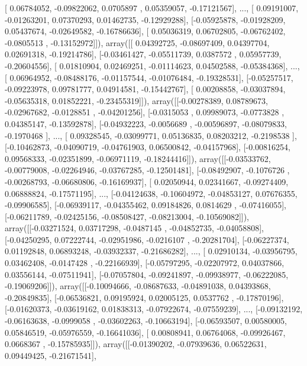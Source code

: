 \documentclass{article}
\begin{document}
       [ 0.06784052, -0.09822062,  0.0705897 ,  0.05359057, -0.17121567],
       ..., 
       [ 0.09191007, -0.01263201,  0.07370293,  0.01462735, -0.12929288],
       [-0.05925878, -0.01928209,  0.05437674, -0.02649582, -0.16786636],
       [ 0.05036319,  0.06702805, -0.06762402, -0.0805513 , -0.13152972]]), array([[ 0.04392725, -0.08697409,  0.04397704,  0.02691318, -0.19214786],
       [-0.03461427, -0.05511739,  0.0387572 ,  0.05957739, -0.20604556],
       [ 0.01810904,  0.02469251, -0.01114623,  0.04502588, -0.05384368],
       ..., 
       [ 0.06964952, -0.08488176, -0.01157544, -0.01076484, -0.19328531],
       [-0.05257517, -0.09223978,  0.09781777,  0.04914581, -0.15442767],
       [ 0.00208858, -0.03037894, -0.05635318,  0.01852221, -0.23455319]]), array([[-0.00278389,  0.08789673, -0.02967682, -0.0128851 , -0.04201256],
       [-0.0315053 ,  0.09989073, -0.0773828 ,  0.04385147, -0.13592878],
       [-0.04932223, -0.0056689 , -0.00596897, -0.08079833, -0.1970468 ],
       ..., 
       [ 0.09328545, -0.03099771,  0.05136835,  0.08203212, -0.2198538 ],
       [-0.10462873, -0.04090719, -0.04761903,  0.06500842, -0.04157968],
       [-0.00816254,  0.09568333, -0.02351899, -0.06971119, -0.18244416]]), array([[-0.03533762, -0.00779008, -0.02264946, -0.03767285, -0.12501481],
       [-0.08492907, -0.1076726 , -0.00268793, -0.06680806, -0.16169937],
       [ 0.02050944,  0.02341667, -0.09274409,  0.06888824, -0.17571195],
       ..., 
       [-0.04124638, -0.10604972, -0.04853127,  0.07676355, -0.09906585],
       [-0.06939117, -0.04355462,  0.09184826,  0.0814629 , -0.07416055],
       [-0.06211789, -0.02425156, -0.08508427, -0.08213004, -0.10569082]]), array([[-0.03271524,  0.03717298, -0.0487145 , -0.04852735, -0.04058808],
       [-0.04250295,  0.07222744, -0.02951986, -0.0216107 , -0.20281704],
       [-0.06227374,  0.01192848,  0.06893248, -0.03932337, -0.21686282],
       ..., 
       [ 0.02910134, -0.03956795,  0.03462408, -0.0147428 , -0.22166939],
       [-0.05797295, -0.02207972,  0.04037866,  0.03556144, -0.07511941],
       [-0.07057804, -0.09241897, -0.09938977, -0.06222085, -0.19069206]]), array([[-0.10094666, -0.08687633, -0.04891038,  0.04393868, -0.20849835],
       [-0.06536821,  0.09195924,  0.02005125,  0.0537762 , -0.17870196],
       [-0.01620373, -0.03619162,  0.01838313, -0.07922674, -0.07559239],
       ..., 
       [-0.09132192, -0.06163638, -0.0999058 , -0.03602263, -0.10663194],
       [-0.06593507,  0.00580005,  0.05846519, -0.05976559, -0.16641036],
       [ 0.00808941,  0.06764068, -0.09926467,  0.0668367 , -0.15785935]]), array([[-0.01390202, -0.07939636,  0.06522631,  0.09449425, -0.21671541],
\end{document}

